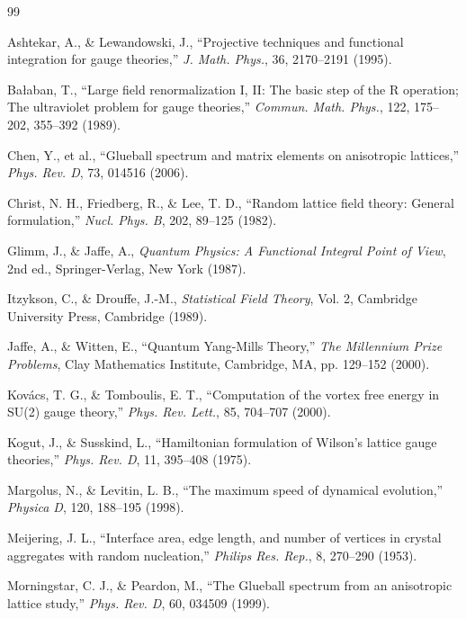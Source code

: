 \documentclass[11pt, a4paper]{article}
\theoremstyle{definition}
\theoremstyle{remark}
\begin{document}
\begin{thebibliography}{99}

Ashtekar, A., \& Lewandowski, J., ``Projective techniques and functional integration for gauge theories,'' \textit{J. Math. Phys.}, 36, 2170--2191 (1995).

Ba\l{}aban, T., ``Large field renormalization I, II: The basic step of the R operation; The ultraviolet problem for gauge theories,'' \textit{Commun. Math. Phys.}, 122, 175--202, 355--392 (1989).

Chen, Y., et al., ``Glueball spectrum and matrix elements on anisotropic lattices,'' \textit{Phys. Rev. D}, 73, 014516 (2006).

Christ, N. H., Friedberg, R., \& Lee, T. D., ``Random lattice field theory: General formulation,'' \textit{Nucl. Phys. B}, 202, 89--125 (1982).

Glimm, J., \& Jaffe, A., \textit{Quantum Physics: A Functional Integral Point of View}, 2nd ed., Springer-Verlag, New York (1987).

Itzykson, C., \& Drouffe, J.-M., \textit{Statistical Field Theory}, Vol. 2, Cambridge University Press, Cambridge (1989).

Jaffe, A., \& Witten, E., ``Quantum Yang-Mills Theory,'' \textit{The Millennium Prize Problems}, Clay Mathematics Institute, Cambridge, MA, pp. 129--152 (2000).

Kov\'acs, T. G., \& Tomboulis, E. T., ``Computation of the vortex free energy in SU(2) gauge theory,'' \textit{Phys. Rev. Lett.}, 85, 704--707 (2000).

Kogut, J., \& Susskind, L., ``Hamiltonian formulation of Wilson's lattice gauge theories,'' \textit{Phys. Rev. D}, 11, 395--408 (1975).

Margolus, N., \& Levitin, L. B., ``The maximum speed of dynamical evolution,'' \textit{Physica D}, 120, 188--195 (1998).

Meijering, J. L., ``Interface area, edge length, and number of vertices in crystal aggregates with random nucleation,'' \textit{Philips Res. Rep.}, 8, 270--290 (1953).

Morningstar, C. J., \& Peardon, M., ``The Glueball spectrum from an anisotropic lattice study,'' \textit{Phys. Rev. D}, 60, 034509 (1999).


\end{thebibliography}
\end{document}
